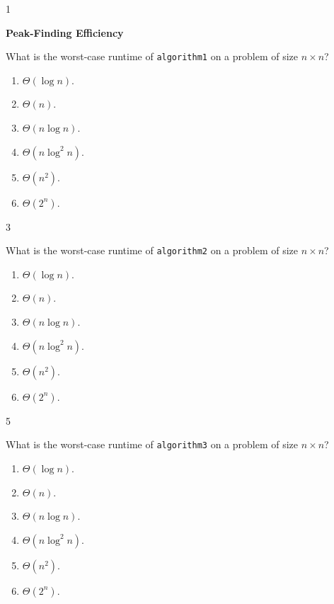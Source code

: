 \documentclass[12pt,twoside]{article}
\begin{document}
\begin{problems}
\begin{problemparts}
        \ifsolution \solution{}
            1
        \fi

    \end{problemparts}

    \problem {} \textbf{Peak-Finding Efficiency}

    \begin{problemparts}

        \problempart {} What is the worst-case runtime of \texttt{algorithm1} on a problem of size $n \times n$?
        \begin{enumerate}
            \item $\Theta(\log n)$.
            \item $\Theta(n)$.
            \item $\Theta(n \log n)$.
            \item $\Theta(n \log^2 n)$.
            \item $\Theta(n^2)$.
            \item $\Theta(2^n)$.
        \end{enumerate}

        \ifsolution \solution{}
            3
        \fi

        \problempart {} What is the worst-case runtime of \texttt{algorithm2} on a problem of size $n \times n$?
        \begin{enumerate}
            \item $\Theta(\log n)$.
            \item $\Theta(n)$.
            \item $\Theta(n \log n)$.
            \item $\Theta(n \log^2 n)$.
            \item $\Theta(n^2)$.
            \item $\Theta(2^n)$.
        \end{enumerate}

        \ifsolution \solution{}
            5
        \fi

        \problempart {} What is the worst-case runtime of \texttt{algorithm3} on a problem of size $n \times n$?
        \begin{enumerate}
            \item $\Theta(\log n)$.
            \item $\Theta(n)$.
            \item $\Theta(n \log n)$.
            \item $\Theta(n \log^2 n)$.
            \item $\Theta(n^2)$.
            \item $\Theta(2^n)$.
        \end{enumerate}


\end{problemparts}
\end{problems}
\end{document}

